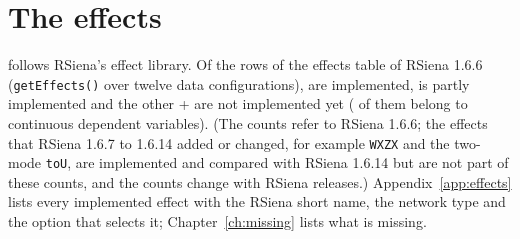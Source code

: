 \chapter{The effects}\label{ch:effects}
\nwsaom{} follows RSiena's effect library. Of the \nTotal{} rows of the effects table of RSiena 1.6.6 (\texttt{getEffects()} over twelve data configurations), \nImpl{} are implemented, \nPartial{} is partly implemented and the other \the\numexpr\nNotImpl+\nNotPlanned\relax{} are not implemented yet (\nNotPlanned{} of them belong to continuous dependent variables). (The counts refer to RSiena 1.6.6; the effects that RSiena 1.6.7 to 1.6.14 added or changed, for example \texttt{WXZX} and the two-mode \texttt{toU}, are implemented and compared with RSiena 1.6.14 but are not part of these counts, and the counts change with RSiena releases.) Appendix~\ref{app:effects} lists every implemented effect with the RSiena short name, the network type and the \nwsaom{} option that selects it; Chapter~\ref{ch:missing} lists what is missing.

